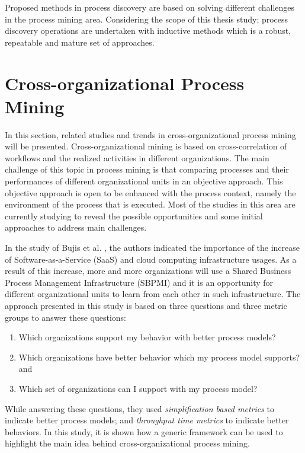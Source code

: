 Proposed methods in process discovery are based on solving different challenges in the process mining area. Considering the scope of this thesis study; process discovery operations are undertaken with inductive methods which is a robust, repeatable and mature set of approaches.

\section{Cross-organizational Process Mining}
\label{sec:cross-organizational-process-mining}
In this section, related studies and trends in cross-organizational process mining will be presented. Cross-organizational mining is based on cross-correlation of workflows and the realized activities in different organizations. The main challenge of this topic in process mining is that comparing processes and their performances of different organizational units in an objective approach. This objective approach is open to be enhanced with the process context, namely the environment of the process that is executed. Most of the studies in this area are currently studying to reveal the possible opportunities and some initial approaches to address main challenges.

In the study of Bujis et al. \cite{buijs2012towards}, the authors indicated the importance of the increase of Software-as-a-Service (SaaS) and cloud computing infrastructure usages. As a result of this increase, more and more organizations will use a Shared Business Process Management Infrastructure (SBPMI) and it is an opportunity for different organizational units to learn from each other in such infrastructure. The approach presented in this study is based on three questions and three metric groups to answer these questions:
\begin{enumerate}
\item Which organizations support my behavior with better process models?
\item Which organizations have better behavior which my process model supports? and
\item Which set of organizations can I support with my process model?
\end{enumerate} While answering these questions, they used \textit{simplification based metrics} to indicate better process models; and \textit{throughput time metrics} to indicate better behaviors. In this study, it is shown how a generic framework can be used to highlight the main idea behind cross-organizational process mining. 


